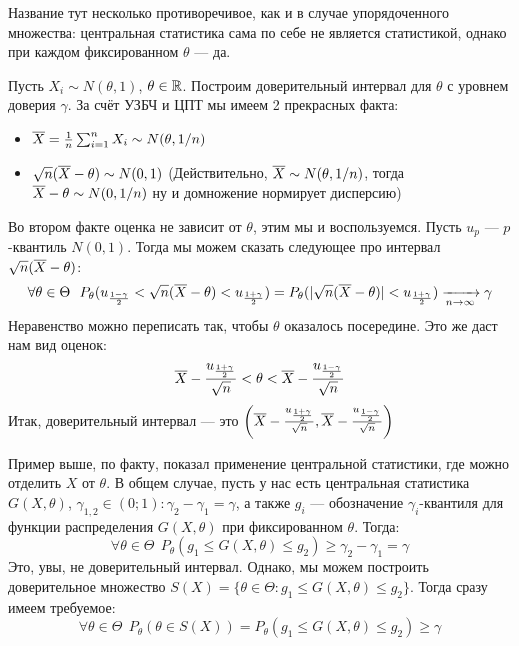 \begin{anote}
	Название тут несколько противоречивое, как и в случае упорядоченного множества: центральная статистика сама по себе не является статистикой, однако при каждом фиксированном $\theta$ --- да.
\end{anote}

\begin{example}
	Пусть $X_i \sim N(\theta, 1)$, $\theta \in \mathbb{R}$. Построим доверительный интервал для $\theta$ с уровнем доверия $\gamma$. За счёт УЗБЧ и ЦПТ мы имеем 2 прекрасных факта:
	\begin{itemize}
		\item $\overline{X} = \frac{1}{n}\sum_{i = 1}^n X_i \sim N(\theta, 1 / n)$
		
		\item $\sqrt{n}(\overline{X} - \theta) \sim N(0, 1)$ (Действительно, $\overline{X} \sim N(\theta, 1 / n)$, тогда $\overline{X} - \theta \sim N(0, 1 / n)$ ну и домножение нормирует дисперсию)
	\end{itemize}
	Во втором факте оценка не зависит от $\theta$, этим мы и воспользуемся. Пусть $u_p$ --- $p$-квантиль $N(0, 1)$. Тогда мы можем сказать следующее про интервал $\sqrt{n}(\overline{X} - \theta)$:
	\[
		\forall \theta \in \Theta\ \ P_\theta(u_{\frac{1 - \gamma}{2}} < \sqrt{n}(\overline{X} - \theta) < u_{\frac{1 + \gamma}{2}}) = P_\theta(|\sqrt{n}(\overline{X} - \theta)| < u_{\frac{1 + \gamma}{2}}) \xrightarrow[n \to \infty]{} \gamma
	\]
	Неравенство можно переписать так, чтобы $\theta$ оказалось посередине. Это же даст нам вид оценок:
	\[
		 \overline{X} - \frac{u_{\frac{1 + \gamma}{2}}}{\sqrt{n}} < \theta < \overline{X} - \frac{u_{\frac{1 - \gamma}{2}}}{\sqrt{n}}
	\]
	Итак, доверительный интервал --- это $\left(\overline{X} - \frac{u_{\frac{1 + \gamma}{2}}}{\sqrt{n}}, \overline{X} - \frac{u_{\frac{1 - \gamma}{2}}}{\sqrt{n}}\right)$
\end{example}

\begin{note}
	Пример выше, по факту, показал применение центральной статистики, где можно отделить $X$ от $\theta$. В общем случае, пусть у нас есть центральная статистика $G(X, \theta)$, $\gamma_{1, 2} \in (0; 1) \colon \gamma_2 - \gamma_1 = \gamma$, а также $g_i$ --- обозначение $\gamma_i$-квантиля для функции распределения $G(X, \theta)$ при фиксированном $\theta$. Тогда:
	\[
		\forall \theta \in \Theta\ \ P_\theta(g_1 \le G(X, \theta) \le g_2) \ge \gamma_2 - \gamma_1 = \gamma
	\]
	Это, увы, не доверительный интервал. Однако, мы можем построить доверительное множество $S(X) = \{\theta \in \Theta \colon g_1 \le G(X, \theta) \le g_2\}$. Тогда сразу имеем требуемое:
	\[
		\forall \theta \in \Theta\ \ P_\theta(\theta \in S(X)) = P_\theta(g_1 \le G(X, \theta) \le g_2) \ge \gamma
	\]
\end{note}


